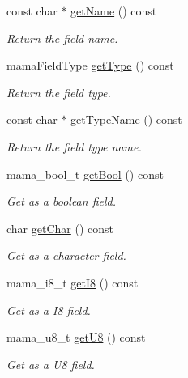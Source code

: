 \begin{DoxyCompactItemize}
const char $\ast$ \hyperlink{classWombat_1_1MamaMsgField_a198a3d93ba4073fe5b0081a5eb6f9339}{getName} () const 
\begin{DoxyCompactList}\small\item\em Return the field name. \item\end{DoxyCompactList}\item 
mamaFieldType \hyperlink{classWombat_1_1MamaMsgField_a9e6045c695521cb57ba0702ffd062458}{getType} () const 
\begin{DoxyCompactList}\small\item\em Return the field type. \item\end{DoxyCompactList}\item 
const char $\ast$ \hyperlink{classWombat_1_1MamaMsgField_a6d164b861f10d4d03d9f95075155785f}{getTypeName} () const 
\begin{DoxyCompactList}\small\item\em Return the field type name. \item\end{DoxyCompactList}\item 
mama\_\-bool\_\-t \hyperlink{classWombat_1_1MamaMsgField_a54beb8b83848f9481939e96e2f626053}{getBool} () const 
\begin{DoxyCompactList}\small\item\em Get as a boolean field. \item\end{DoxyCompactList}\item 
char \hyperlink{classWombat_1_1MamaMsgField_a44f2b43319dc08e49a206f02a97af1c3}{getChar} () const 
\begin{DoxyCompactList}\small\item\em Get as a character field. \item\end{DoxyCompactList}\item 
mama\_\-i8\_\-t \hyperlink{classWombat_1_1MamaMsgField_a6c90df89e3d3572766a19da5f742e883}{getI8} () const 
\begin{DoxyCompactList}\small\item\em Get as a I8 field. \item\end{DoxyCompactList}\item 
mama\_\-u8\_\-t \hyperlink{classWombat_1_1MamaMsgField_a186cab304aeb88d3f5cdc17a3d6885cc}{getU8} () const 
\begin{DoxyCompactList}\small\item\em Get as a U8 field. \item\end{DoxyCompactList}\item 

\end{DoxyCompactItemize}

